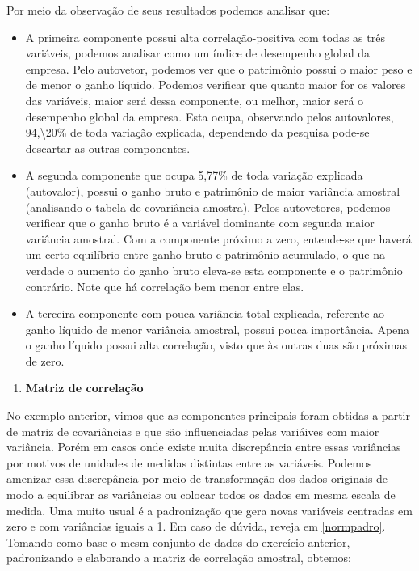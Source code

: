 \documentclass[
]{book}
\providecommand{\tightlist}{%
  \setlength{\itemsep}{0pt}\setlength{\parskip}{0pt}}
\begin{document}
Por meio da observação de seus resultados podemos analisar que:

\begin{itemize}
\item
  A primeira componente possui alta correlação-positiva com todas as três variáveis, podemos analisar como um índice de desempenho global da empresa. Pelo autovetor, podemos ver que o patrimônio possui o maior peso e de menor o ganho líquido. Podemos verificar que quanto maior for os valores das variáveis, maior será dessa componente, ou melhor, maior será o desempenho global da empresa. Esta ocupa, observando pelos autovalores, 94,\textbackslash{}20\% de toda variação explicada, dependendo da pesquisa pode-se descartar as outras componentes.
\item
  A segunda componente que ocupa 5,77\% de toda variação explicada (autovalor), possui o ganho bruto e patrimônio de maior variância amostral (analisando o tabela de covariância amostra). Pelos autovetores, podemos verificar que o ganho bruto é a variável dominante com segunda maior variância amostral. Com a componente próximo a zero, entende-se que haverá um certo equilíbrio entre ganho bruto e patrimônio acumulado, o que na verdade o aumento do ganho bruto eleva-se esta componente e o patrimônio contrário. Note que há correlação bem menor entre elas.
\item
  A terceira componente com pouca variância total explicada, referente ao ganho líquido de menor variância amostral, possui pouca importância. Apena o ganho líquido possui alta correlação, visto que às outras duas são próximas de zero.
\end{itemize}

\begin{enumerate}
\def\labelenumi{\arabic{enumi}.}
\setcounter{enumi}{1}
\tightlist
\item
  \textbf{Matriz de correlação}
\end{enumerate}

No exemplo anterior, vimos que as componentes principais foram obtidas a partir de matriz de covariâncias e que são influenciadas pelas variáives com maior variância. Porém em casos onde existe muita discrepância entre essas variâncias por motivos de unidades de medidas distintas entre as variáveis. Podemos amenizar essa discrepância por meio de transformação dos dados originais de modo a equilibrar as variâncias ou colocar todos os dados em mesma escala de medida. Uma muito usual é a padronização que gera novas variáveis centradas em zero e com variâncias iguais a 1. Em caso de dúvida, reveja em \ref{normpadro}. Tomando como base o mesm conjunto de dados do exercício anterior, padronizando e elaborando a matriz de correlação amostral, obtemos:
\end{document}
